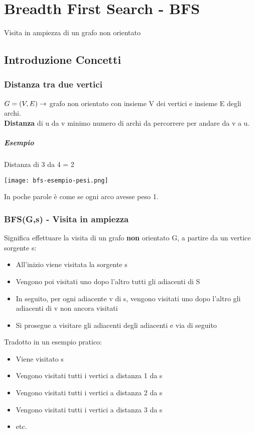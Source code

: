 \chapter{Breadth First Search - BFS}
Visita in ampiezza di un grafo non orientato
\section{Introduzione Concetti}
\subsection*{Distanza tra due vertici}
$G=(V,E) \rightarrow$ grafo non orientato con insieme V dei vertici e insieme E degli archi.\\
\textbf{Distanza} di u da v \ra minimo numero di archi da percorrere per andare da v a u.
\paragraph*{Esempio} Distanza di 3 da 4 = 2
\begin{center}
    \texttt{[image: bfs-esempio-pesi.png]}
\end{center}
In poche parole è come se ogni arco avesse peso 1.
\subsection*{BFS(G,s) - Visita in ampiezza}
Significa effettuare la visita di un grafo \textbf{non} orientato G, a partire da un vertice
sorgente s:
\begin{itemize}
    \item All'inizio viene visitata la sorgente s
    \item Vengono poi visitati uno dopo l'altro tutti gli adiacenti di S
    \item In seguito, per ogni adiacente v di s, vengono visitati uno dopo l'altro
    gli adiacenti di v non ancora visitati
    \item Si prosegue a visitare gli adiacenti degli adiacenti e via di seguito
\end{itemize}
Tradotto in un esempio pratico:
\begin{itemize}
    \item Viene visitato s
    \item Vengono visitati tutti i vertici a distanza 1 da s
    \item Vengono visitati tutti i vertici a distanza 2 da s
    \item Vengono visitati tutti i vertici a distanza 3 da s
    \item etc.
\end{itemize}
